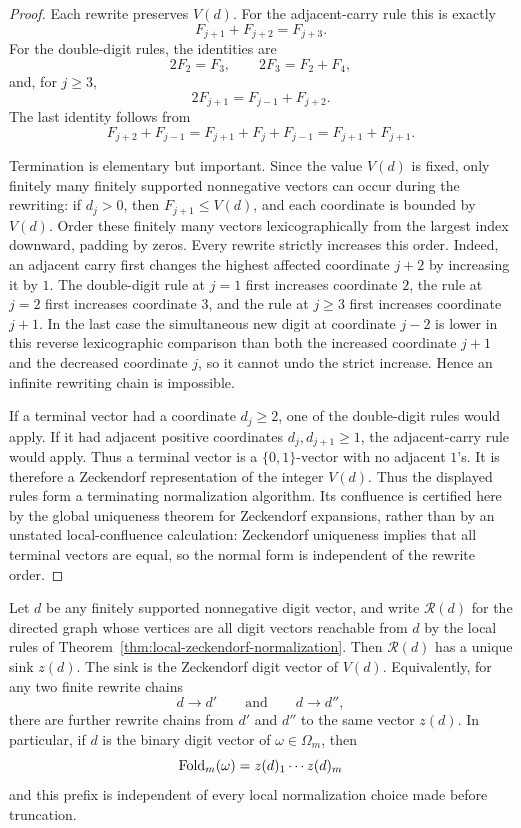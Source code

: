 \begin{proof}
Each rewrite preserves \(V(d)\).  For the adjacent-carry rule this is exactly
\[
F_{j+1}+F_{j+2}=F_{j+3}.
\]
For the double-digit rules, the identities are
\[
2F_2=F_3,\qquad 2F_3=F_2+F_4,
\]
and, for \(j\ge3\),
\[
2F_{j+1}=F_{j-1}+F_{j+2}.
\]
The last identity follows from
\[
F_{j+2}+F_{j-1}
=F_{j+1}+F_j+F_{j-1}
=F_{j+1}+F_{j+1}.
\]

Termination is elementary but important.  Since the value \(V(d)\) is fixed,
only finitely many finitely supported nonnegative vectors can occur during
the rewriting: if \(d_j>0\), then \(F_{j+1}\le V(d)\), and each coordinate is
bounded by \(V(d)\).  Order these finitely many vectors lexicographically from
the largest index downward, padding by zeros.  Every rewrite strictly
increases this order.  Indeed, an adjacent carry first changes the highest
affected coordinate \(j+2\) by increasing it by \(1\).  The double-digit rule
at \(j=1\) first increases coordinate \(2\), the rule at \(j=2\) first
increases coordinate \(3\), and the rule at \(j\ge3\) first increases
coordinate \(j+1\).  In the last case the simultaneous new digit at
coordinate \(j-2\) is lower in this reverse lexicographic comparison than
both the increased coordinate \(j+1\) and the decreased coordinate \(j\), so
it cannot undo the strict increase.  Hence an infinite rewriting chain is
impossible.

If a terminal vector had a coordinate \(d_j\ge2\), one of the double-digit
rules would apply.  If it had adjacent positive coordinates
\(d_j,d_{j+1}\ge1\), the adjacent-carry rule would apply.  Thus a terminal
vector is a \(\{0,1\}\)-vector with no adjacent \(1\)'s.  It is therefore a
Zeckendorf representation of the integer \(V(d)\).  Thus the displayed rules
form a terminating normalization algorithm.  Its confluence is certified here
by the global uniqueness theorem for Zeckendorf expansions, rather than by an
unstated local-confluence calculation: Zeckendorf uniqueness
\cite{Zeckendorf1972} implies that all terminal vectors are equal, so the
normal form is independent of the rewrite order.
\end{proof}

\begin{corollary}
\label{cor:local-normalization-church-rosser}
Let \(d\) be any finitely supported nonnegative digit vector, and write
\(\mathcal R(d)\) for the directed graph whose vertices are all digit vectors
reachable from \(d\) by the local rules of
Theorem~\ref{thm:local-zeckendorf-normalization}.  Then \(\mathcal R(d)\) has
a unique sink \(z(d)\).  The sink is the Zeckendorf digit vector of \(V(d)\).
Equivalently, for any two finite rewrite chains
\[
d\longrightarrow d'\qquad\text{and}\qquad d\longrightarrow d'',
\]
there are further rewrite chains from \(d'\) and \(d''\) to the same vector
\(z(d)\).  In particular, if \(d\) is the binary digit vector of
\(\omega\in\Omega_m\), then
\[
\mathrm{Fold}_m(\omega)=z(d)_1\cdots z(d)_m
\]
and this prefix is independent of every local normalization choice made before
truncation.
\end{corollary}

